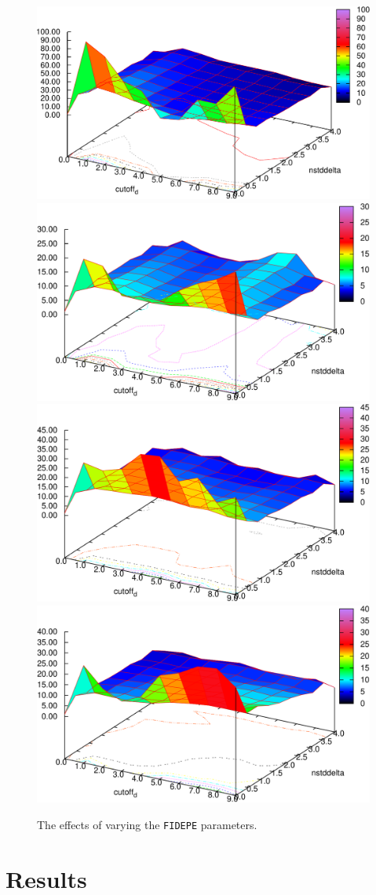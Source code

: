 \documentclass[12pt]{article}
\begin{document}
\begin{figure}[ht]
\centering
\includegraphics[width=0.47\linewidth]{../plots/fidepe/Aggregation_3d-crop}
\includegraphics[width=0.47\linewidth]{../plots/fidepe/Compound_3d-crop} \\
\includegraphics[width=0.47\linewidth]{../plots/fidepe/jain_3d-crop}
\includegraphics[width=0.47\linewidth]{../plots/fidepe/spiral_3d-crop}
\caption{The effects of varying the \texttt{FIDEPE} parameters.}
\label{fig:FIDPEPEplots}
\end{figure}
\restoregeometry
\doublespacing


\section{Results}
\end{document}
